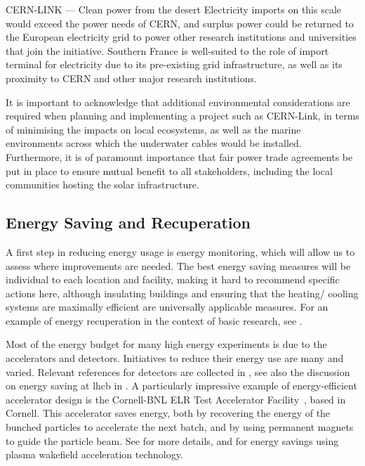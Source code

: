\documentclass[../SustainableHEP.tex]{subfiles}
\begin{document}
\begin{casestudy}{CERN-LINK --- Clean power from the desert}
Electricity imports on this scale would exceed the power needs of CERN, and surplus power could be returned to the European electricity grid to power other research institutions and universities that join the initiative. Southern France is well-suited to the role of import terminal for electricity due to its pre-existing grid infrastructure, as well as its proximity to CERN and other major research institutions. 

It is important to acknowledge that additional environmental considerations are required when planning and implementing a project such as CERN-Link, in terms of minimising the impacts on local ecosystems, as well as the marine environments across which the underwater cables would be installed.  Furthermore, it is of paramount importance that fair power trade agreements be put in place to ensure mutual benefit to all stakeholders, including the local communities hosting the solar infrastructure.

\end{casestudy}



\subsection{Energy Saving and Recuperation}
\label{sec:Ene-Saving}
A first step in reducing energy usage is energy monitoring, which will allow us to assess where improvements are needed. The best energy saving measures will be individual to each location and facility, making it hard to recommend specific actions here, although insulating buildings and ensuring that the heating/ cooling systems are maximally efficient are universally applicable measures. For an example of energy recuperation in the context of basic research, see .

Most of the energy budget for many high energy experiments is due to the accelerators and detectors. Initiatives to reduce their energy use are many and varied. Relevant references for detectors are collected in , see also the discussion on energy saving at \acrshort{lhcb} in .  A particularly impressive example of energy-efficient accelerator design is the Cornell-BNL ELR Test Accelerator Facility~\cite{Bartnik:2020pos}, based in Cornell. This accelerator saves energy, both by recovering the energy of the bunched particles to accelerate the next batch, and by using permanent magnets to guide the particle beam.  See  for more details, and  for energy savings using plasma wakefield acceleration technology.
\end{document}
